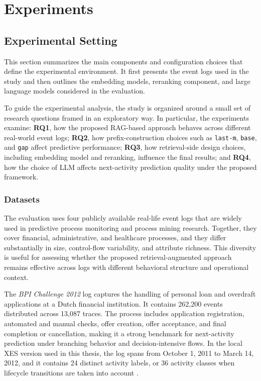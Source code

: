 \chapter{Experiments}

\section{Experimental Setting}
This section summarizes the main components and configuration choices that define the experimental environment. It first presents the event logs used in the study and then outlines the embedding models, reranking component, and large language models considered in the evaluation.

To guide the experimental analysis, the study is organized around a small set of research questions framed in an exploratory way. In particular, the experiments examine: \textbf{RQ1}, how the proposed RAG-based approach behaves across different real-world event logs; \textbf{RQ2}, how prefix-construction choices such as \texttt{last-m}, \texttt{base}, and \texttt{gap} affect predictive performance; \textbf{RQ3}, how retrieval-side design choices, including embedding model and reranking, influence the final results; and \textbf{RQ4}, how the choice of LLM affects next-activity prediction quality under the proposed framework.

\subsection{Datasets}
The evaluation uses four publicly available real-life event logs that are widely used in predictive process monitoring and process mining research. Together, they cover financial, administrative, and healthcare processes, and they differ substantially in size, control-flow variability, and attribute richness. This diversity is useful for assessing whether the proposed retrieval-augmented approach remains effective across logs with different behavioral structure and operational context.

The \textit{BPI Challenge 2012} log captures the handling of personal loan and overdraft applications at a Dutch financial institution. It contains 262,200 events distributed across 13,087 traces. The process includes application registration, automated and manual checks, offer creation, offer acceptance, and final completion or cancellation, making it a strong benchmark for next-activity prediction under branching behavior and decision-intensive flows. In the local XES version used in this thesis, the log spans from October 1, 2011 to March 14, 2012, and it contains 24 distinct activity labels, or 36 activity classes when lifecycle transitions are taken into account \cite{bpi2012dataset}.

